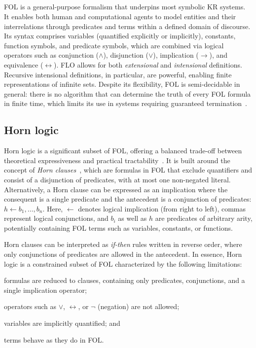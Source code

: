 \subsection{}\label{subsec:first-order-logic}
%
\Gls{FOL} is a general-purpose formalism that underpins most symbolic \gls{KR} systems.
%
It enables both human and computational agents to model entities and their interrelations through predicates and terms within a defined domain of discourse.
%
Its syntax comprises variables (quantified explicitly or implicitly), constants, function symbols, and predicate symbols, which are combined via logical operators such as conjunction (\(\wedge\)), disjunction (\(\vee\)), implication (\(\rightarrow\)), and equivalence (\(\leftrightarrow\)).
%
\Gls{FLO} allows for both \emph{extensional} and \emph{intensional} definitions.
%
Recursive intensional definitions, in particular, are powerful, enabling finite representations of infinite sets.
%
Despite its flexibility, \gls{FOL} is semi-decidable in general: there is no algorithm that can determine the truth of every \gls{FOL} formula in finite time, which limits its use in systems requiring guaranteed termination~\cite{DBLP:conf/dlog/2003handbook}.


\subsection{Horn logic}\label{subsec:horn-logic}
%
Horn logic is a significant subset of \gls{FOL}, offering a balanced trade-off between theoretical expressiveness and practical tractability~\cite{DBLP:journals/jcss/Makowsky87}.
%
It is built around the concept of \emph{Horn clauses}~\cite{DBLP:journals/jsyml/Horn51}, which are formulas in \gls{FOL} that exclude quantifiers and consist of a disjunction of predicates, with at most one non-negated literal.
%
Alternatively, a Horn clause can be expressed as an implication where the consequent is a single predicate and the antecedent is a conjunction of predicates: \(h \gets b_1, \dots, b_n\).
%
Here, \(\gets\) denotes logical implication (from right to left), commas represent logical conjunctions, and \(b_i\) as well as \(h\) are predicates of arbitrary arity, potentially containing \gls{FOL} terms such as variables, constants, or functions.

Horn clauses can be interpreted as \emph{if-then} rules written in reverse order, where only conjunctions of predicates are allowed in the antecedent.
%
In essence, Horn logic is a constrained subset of \gls{FOL} characterized by the following limitations:
%
\begin{inlinelist}
%
    \item formulas are reduced to clauses, containing only predicates, conjunctions, and a single implication operator;
    \item operators such as \(\lor\), \(\leftrightarrow\), or \(\neg\) (negation) are not allowed;
    \item variables are implicitly quantified; and
    \item terms behave as they do in \gls{FOL}.
\end{inlinelist}


